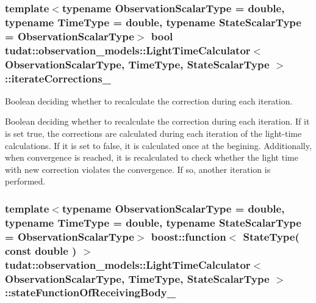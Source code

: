 \subsubsection[{\texorpdfstring{iterate\+Corrections\+\_\+}{iterateCorrections_}}]{\setlength{\rightskip}{0pt plus 5cm}template$<$typename Observation\+Scalar\+Type  = double, typename Time\+Type  = double, typename State\+Scalar\+Type  = Observation\+Scalar\+Type$>$ bool {\bf tudat\+::observation\+\_\+models\+::\+Light\+Time\+Calculator}$<$ Observation\+Scalar\+Type, Time\+Type, State\+Scalar\+Type $>$\+::iterate\+Corrections\+\_\+\hspace{0.3cm}{\ttfamily [protected]}}\hypertarget{classtudat_1_1observation__models_1_1LightTimeCalculator_a585fe91b5f74288844fc855771f73dff}{}\label{classtudat_1_1observation__models_1_1LightTimeCalculator_a585fe91b5f74288844fc855771f73dff}


Boolean deciding whether to recalculate the correction during each iteration. 

Boolean deciding whether to recalculate the correction during each iteration. If it is set true, the corrections are calculated during each iteration of the light-\/time calculations. If it is set to false, it is calculated once at the begining. Additionally, when convergence is reached, it is recalculated to check whether the light time with new correction violates the convergence. If so, another iteration is performed. 
\subsubsection[{\texorpdfstring{state\+Function\+Of\+Receiving\+Body\+\_\+}{stateFunctionOfReceivingBody_}}]{\setlength{\rightskip}{0pt plus 5cm}template$<$typename Observation\+Scalar\+Type  = double, typename Time\+Type  = double, typename State\+Scalar\+Type  = Observation\+Scalar\+Type$>$ boost\+::function$<$ State\+Type( const double ) $>$ {\bf tudat\+::observation\+\_\+models\+::\+Light\+Time\+Calculator}$<$ Observation\+Scalar\+Type, Time\+Type, State\+Scalar\+Type $>$\+::state\+Function\+Of\+Receiving\+Body\+\_\+\hspace{0.3cm}{\ttfamily [protected]}}\hypertarget{classtudat_1_1observation__models_1_1LightTimeCalculator_a14e286292e8443509fb55c29668b063b}{}\label{classtudat_1_1observation__models_1_1LightTimeCalculator_a14e286292e8443509fb55c29668b063b}


